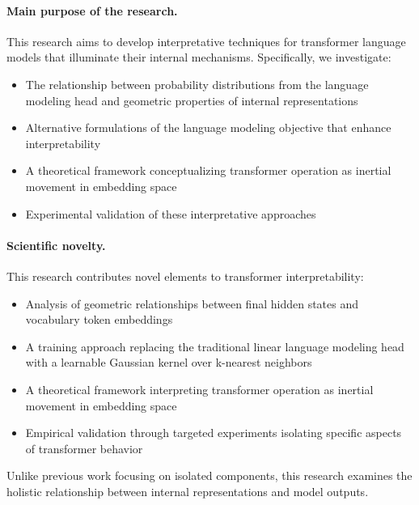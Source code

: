 \paragraph{Main purpose of the research.}
This research aims to develop interpretative techniques for transformer language models that illuminate their internal mechanisms. Specifically, we investigate:
\begin{itemize}
    \item The relationship between probability distributions from the language modeling head and geometric properties of internal representations
    \item Alternative formulations of the language modeling objective that enhance interpretability
    \item A theoretical framework conceptualizing transformer operation as inertial movement in embedding space
    \item Experimental validation of these interpretative approaches
\end{itemize}

\paragraph{Scientific novelty.}
This research contributes novel elements to transformer interpretability:
\begin{itemize}
    \item Analysis of geometric relationships between final hidden states and vocabulary token embeddings
    \item A training approach replacing the traditional linear language modeling head with a learnable Gaussian kernel over k-nearest neighbors
    \item A theoretical framework interpreting transformer operation as inertial movement in embedding space
    \item Empirical validation through targeted experiments isolating specific aspects of transformer behavior
\end{itemize}
Unlike previous work focusing on isolated components, this research examines the holistic relationship between internal representations and model outputs.

